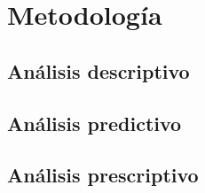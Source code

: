 \chapter{Metodología}


\section{Análisis descriptivo}

\lipsum[10-12]

\section{Análisis predictivo}

\lipsum[12-14]

\section{Análisis prescriptivo}

\lipsum[14-16]